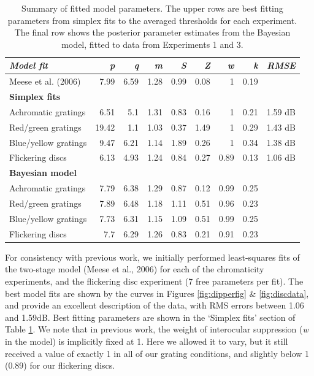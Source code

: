 \documentclass[
]{article}
\begin{document}
\begin{table}

\caption{\label{tab:parametertable}Summary of fitted model parameters. The upper rows are best fitting parameters from simplex fits to the averaged thresholds for each experiment. The final row shows the posterior parameter estimates from the Bayesian model, fitted to data from Experiments 1 and 3.}
\centering
\begin{tabular}[t]{lrrrrrrrr}
\toprule
\textbf{\em{Model fit}} & \textbf{\em{p}} & \textbf{\em{q}} & \textbf{\em{m}} & \textbf{\em{S}} & \textbf{\em{Z}} & \textbf{\em{w}} & \textbf{\em{k}} & \textbf{\em{RMSE}}\\
\midrule
Meese et al. (2006) & 7.99 & 6.59 & 1.28 & 0.99 & 0.08 & 1 & 0.19 & \\
\midrule
\textbf{Simplex fits} & \textbf{} & \textbf{} & \textbf{} & \textbf{} & \textbf{} & \textbf{} & \textbf{} & \textbf{}\\
Achromatic gratings & 6.51 & 5.1 & 1.31 & 0.83 & 0.16 & 1 & 0.21 & 1.59 dB\\
Red/green gratings & 19.42 & 1.1 & 1.03 & 0.37 & 1.49 & 1 & 0.29 & 1.43 dB\\
Blue/yellow gratings & 9.47 & 6.21 & 1.14 & 1.89 & 0.26 & 1 & 0.34 & 1.38 dB\\
Flickering discs & 6.13 & 4.93 & 1.24 & 0.84 & 0.27 & 0.89 & 0.13 & 1.06 dB\\
\midrule
\textbf{Bayesian model} & \textbf{} & \textbf{} & \textbf{} & \textbf{} & \textbf{} & \textbf{} & \textbf{} & \textbf{}\\
Achromatic gratings & 7.79 & 6.38 & 1.29 & 0.87 & 0.12 & 0.99 & 0.25 & \\
Red/green gratings & 7.89 & 6.48 & 1.18 & 1.11 & 0.51 & 0.96 & 0.23 & \\
Blue/yellow gratings & 7.73 & 6.31 & 1.15 & 1.09 & 0.51 & 0.99 & 0.25 & \\
Flickering discs & 7.7 & 6.29 & 1.26 & 0.83 & 0.21 & 0.91 & 0.23 & \\
\bottomrule
\end{tabular}
\end{table}

For consistency with previous work, we initially performed least-squares fits of the two-stage model (Meese et al., 2006) for each of the chromaticity experiments, and the flickering disc experiment (7 free parameters per fit). The best model fits are shown by the curves in Figures \ref{fig:dipperfig} \& \ref{fig:discdata}, and provide an excellent description of the data, with RMS errors between 1.06 and 1.59dB. Best fitting parameters are shown in the `Simplex fits' section of Table \ref{tab:parametertable}. We note that in previous work, the weight of interocular suppression (\emph{w} in the model) is implicitly fixed at 1. Here we allowed it to vary, but it still received a value of exactly 1 in all of our grating conditions, and slightly below 1 (0.89) for our flickering discs.
\end{document}
